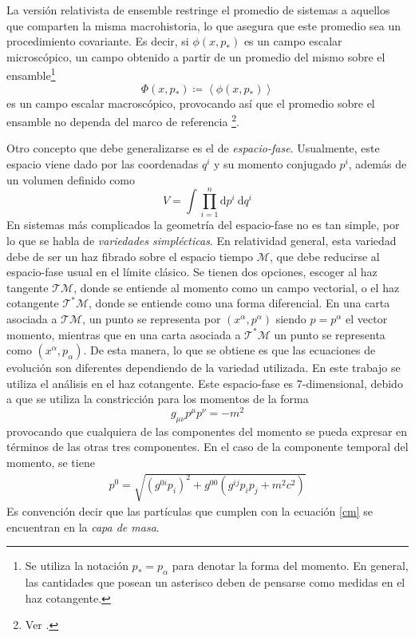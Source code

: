 \documentclass[11pt,twoside,openright,spanish]{report}
\numberwithin{equation}{chapter}
\numberwithin{figure}{chapter}
\numberwithin{table}{chapter}
\begin{document}
La versión relativista de ensemble restringe el promedio de sistemas a aquellos que comparten la misma macrohistoria, lo que asegura que este promedio sea un procedimiento covariante. Es decir, si $\phi(x,p_*)$ es un campo escalar microscópico, un campo obtenido a partir de un promedio del mismo sobre el ensamble\footnote{Se utiliza la notación $p_*=p_\alpha$ para denotar la forma del momento. En general, las cantidades que posean un asterisco deben de pensarse como medidas en el haz cotangente.}
\begin{equation}
\Phi(x,p_*)\coloneqq\left<\phi(x,p_*)\right>
\end{equation}
es un campo escalar macroscópico, provocando así que el promedio sobre el ensamble no dependa del marco de referencia \footnote{Ver \citet{grootrktpaa}.}.

Otro concepto que debe generalizarse es el de \textit{espacio-fase}. Usualmente, este espacio viene dado por las coordenadas $q^i$ y su momento conjugado $p^i$, además de un volumen definido como
\begin{equation}
V=\int\prod_{i=1}^n \text{d}p^i\ \text{d}q^i
\end{equation}
En sistemas más complicados la geometría del espacio-fase no es tan simple, por lo que se habla de \textit{variedades simplécticas}. En relatividad general, esta variedad debe de ser un haz fibrado sobre el espacio tiempo $\mathcal{M}$, que debe reducirse al espacio-fase usual en el límite clásico. Se tienen dos opciones, escoger al haz tangente $\mathcal{TM}$, donde se entiende al momento como un campo vectorial, o el haz cotangente $\mathcal{T^*M}$, donde se entiende como una forma diferencial. En una carta asociada a $\mathcal{TM}$, un punto se representa por $(x^\alpha,p^\alpha)$ siendo $p=p^\alpha$ el vector momento, mientras que en una carta asociada a $\mathcal{T^*M}$ un punto se representa como $(x^\alpha,p_\alpha)$. De esta manera, lo que se obtiene es que las ecuaciones de evolución son diferentes dependiendo de la variedad utilizada. En este trabajo se utiliza el análisis en el haz cotangente. Este espacio-fase es 7-dimensional, debido a que se utiliza la constricción para los momentos de la forma
\begin{equation}
g_{\mu\nu}p^\mu p^\nu=-m^2
\label{cm}
\end{equation}
provocando que cualquiera de las componentes del momento se pueda expresar en términos de las otras tres componentes. En el caso de la componente temporal del momento, se tiene
\begin{eqnarray}
p^0=\sqrt{\left(g^{0i}p_i\right)^2+g^{00}\left(g^{ij}p_ip_j+m^2c^2\right)}
\end{eqnarray}
Es convención decir que las partículas que cumplen con la ecuación \eqref{cm} se encuentran en la \textit{capa de masa}.
\end{document}
